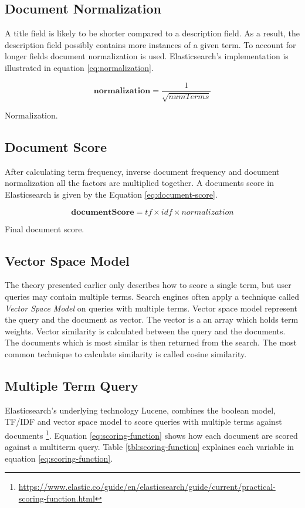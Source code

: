 \subsection{Document Normalization}
A title field is likely to be shorter compared to a description field.
As a result, the description field possibly contains more instances of a given term.
To account for longer fields document normalization is used.
Elasticsearch's implementation is illustrated in equation \ref{eq:normalization}.

\begin{cequation}[H]
	\begin{equation}
		\mathbf{normalization} = \frac{1}{\sqrt{numTerms}}
	\end{equation}
	\caption{Normalization.}
  \label{eq:normalization}
\end{cequation}

\subsection{Document Score}
\label{sec:doc-score}
After calculating term frequency, inverse document frequency and document normalization all the factors are multiplied together.
A documents score in Elasticsearch is given by the Equation \ref{eq:document-score}.

\begin{cequation}[H]
	\begin{equation}
		\mathbf{documentScore} = tf \times idf \times normalization
	\end{equation}
	\caption{Final document score.}
  \label{eq:document-score}
\end{cequation}

\subsection{Vector Space Model}
The theory presented earlier only describes how to score a single term, but user queries may contain multiple terms.
Search engines often apply a technique called \textit{Vector Space Model} on queries with multiple terms.
Vector space model represent the query and the document as vector.
The vector is a an array which holds term weights.
Vector similarity is calculated between the query and the documents.
The documents which is most similar is then returned from the search.
The most common technique to calculate similarity is called cosine similarity.

\subsection{Multiple Term Query}
Elasticsearch's underlying technology Lucene,
combines the boolean model, TF/IDF and vector space model to score queries with multiple terms against documents \footnote{\url{https://www.elastic.co/guide/en/elasticsearch/guide/current/practical-scoring-function.html}}.
Equation \ref{eq:scoring-function} shows how each document are scored against a multiterm query.
Table \ref{tbl:scoring-function} explaines each variable in equation \ref{eq:scoring-function}.

